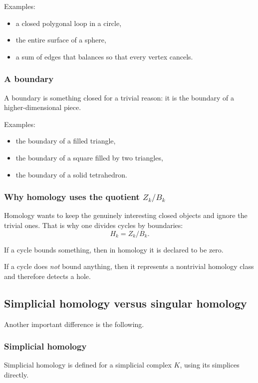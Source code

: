 \documentclass[12pt,a4paper]{article}
\theoremstyle{notespace}
\begin{document}
Examples:
\begin{itemize}
	\item a closed polygonal loop in a circle,
	\item the entire surface of a sphere,
	\item a sum of edges that balances so that every vertex cancels.
\end{itemize}

\subsubsection{A boundary}

A boundary is something closed for a trivial reason: it is the boundary of a higher-dimensional piece.

Examples:
\begin{itemize}
	\item the boundary of a filled triangle,
	\item the boundary of a square filled by two triangles,
	\item the boundary of a solid tetrahedron.
\end{itemize}

\subsubsection{Why homology uses the quotient \texorpdfstring{$Z_k/B_k$}{Zk/Bk}}

Homology wants to keep the genuinely interesting closed objects and ignore the trivial ones. That is why one divides cycles by boundaries:
\[
H_k=Z_k/B_k.
\]

If a cycle bounds something, then in homology it is declared to be zero.

If a cycle does \emph{not} bound anything, then it represents a nontrivial homology class and therefore detects a hole.

\subsection{Simplicial homology versus singular homology}

Another important difference is the following.

\subsubsection{Simplicial homology}

Simplicial homology is defined for a simplicial complex \(K\), using its simplices directly.
\end{document}
